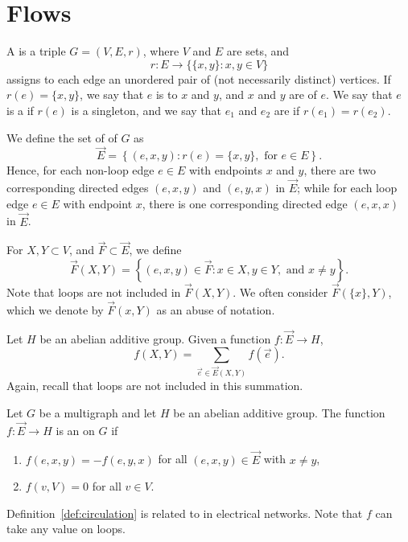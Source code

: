 \chapter{Flows}

A  is a triple \(G = (V, E, r)\),
where \(V\) and \(E\) are sets, and
\begin{equation}
	r \colon E \to \{ \{x, y\} : x, y \in V \}
\end{equation}
assigns to each edge an unordered pair of (not necessarily distinct) vertices.
If \(r(e) = \{x, y\}\), we say that \(e\) is  to \(x\) and \(y\), and \(x\) and \(y\) are  of \(e\).
We say that \(e\) is a  if \(r(e)\) is a singleton, and we say that \(e_1\) and \(e_2\) are  if \(r(e_1) = r(e_2)\).

We define the set of  of \(G\) as
\begin{equation}
	\vec{E} =
	\left\{
	(e, x, y)
	:
	r(e) = \{x, y\},
	\text{ for } e \in E
	\right\}.
\end{equation}
Hence, for each non-loop edge \(e \in E\) with endpoints \(x\) and \(y\),
there are two corresponding directed edges \((e, x, y)\) and \((e, y, x)\) in \(\vec{E}\);
while for each loop edge \(e \in E\) with endpoint \(x\),
there is one corresponding directed edge \((e, x, x)\) in \(\vec{E}\).

For \(X, Y \subset V\), and \(\vec{F} \subset \vec{E}\), we define
\begin{equation}
	\vec{F}(X, Y) =
	\left\{
	(e, x, y) \in \vec{F}
	:
	x \in X,
	y \in Y,
	\text{ and } x \neq y
	\right\}.
\end{equation}
Note that loops are not included in \(\vec{F}(X, Y)\).
We often consider \(\vec{F}(\{x\}, Y)\), which we denote by \(\vec{F}(x, Y)\) as an abuse of notation.

Let \(H\) be an abelian additive group.
Given a function \(f : \vec{E} \to H\),
\begin{equation}
	f(X, Y) = \sum_{\vec{e} \in \vec{E}(X, Y)} f(\vec{e}).
\end{equation}
Again, recall that loops are not included in this summation.

\begin{definition}[\(H\)-circulation] \label{def:circulation}
	Let \(G\) be a multigraph and let \(H\) be an abelian additive group.
	The function \(f \colon \vec{E} \to H\) is an  on \(G\) if
	\begin{enumerate}
		\item \(f(e, x, y) = -f(e, y, x)\) for all \((e, x, y) \in \vec{E}\) with \(x \neq y\),
		      \label{item:circulation_antisymmetry}
		\item \(f(v, V) = 0\) for all \(v \in V\).
		      \label{item:circulation_balance}
	\end{enumerate}
\end{definition}
Definition~\ref{def:circulation} is related to  in electrical networks.
Note that \(f\) can take any value on loops.

